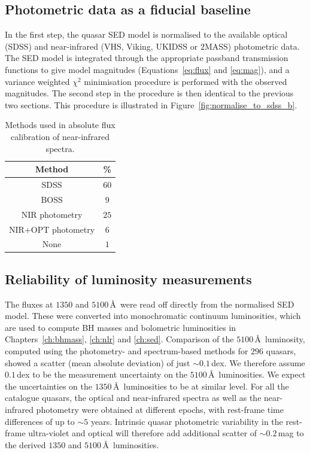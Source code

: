 \subsection{Photometric data as a fiducial baseline}

In the first step, the quasar SED model is normalised to the available optical (SDSS) and near-infrared (VHS, Viking, UKIDSS or $2$MASS) photometric data. 
The SED model is integrated through the appropriate passband transmission functions to give model magnitudes (Equations~\ref{eq:flux} and \ref{eq:mag}), and a variance weighted $\chi^2$ minimisation procedure is performed with the observed magnitudes.
The second step in the procedure is then identical to the previous two sections.   
This procedure is illustrated in Figure~\ref{fig:normalise_to_sdss_b}. 

\begin{table}
  \centering
  \footnotesize 
    \begin{tabular}{cc} 
    \hline
    Method & \% \\
    \hline
    SDSS               & $60$ \\
    BOSS               & $9$ \\
    NIR photometry     & $25$ \\
    NIR+OPT photometry & $6$ \\
    None               & $1$ \\    
    \hline
    \end{tabular}
    \caption[{Methods used in absolute flux calibration of near-infrared spectra.}]{Methods used in absolute flux calibration of near-infrared spectra.}
  \label{tab:flux_calibration}
\end{table} 

\subsection{Reliability of luminosity measurements}

The fluxes at $1350$ and $5100$\,\AA\, were read off directly from the normalised SED model. 
These were converted into monochromatic continuum luminosities, which are used to compute BH masses and bolometric luminosities in Chapters~\ref{ch:bhmass}, \ref{ch:nlr} and \ref{ch:sed}. 
Comparison of the $5100$\,\AA\, luminosity, computed using the photometry- and spectrum-based methods for $296$ quasars, showed a scatter (mean absolute deviation) of just $\sim0.1$\,dex.
We therefore assume $0.1$\,dex to be the measurement uncertainty on the $5100$\,\AA\, luminosities.
We expect the uncertainties on the $1350$\,\AA\, luminosities to be at similar level.  
For all the catalogue quasars, the optical and near-infrared spectra as well as the near-infrared photometry were obtained at different epochs, with rest-frame time differences of up to $\sim5$ years. 
Intrinsic quasar photometric variability in the rest-frame ultra-violet and optical will therefore add additional scatter of $\sim0.2$\,mag \citep[e.g.][]{macleod10} to the derived $1350$ and $5100$\,\AA\, luminosities.


